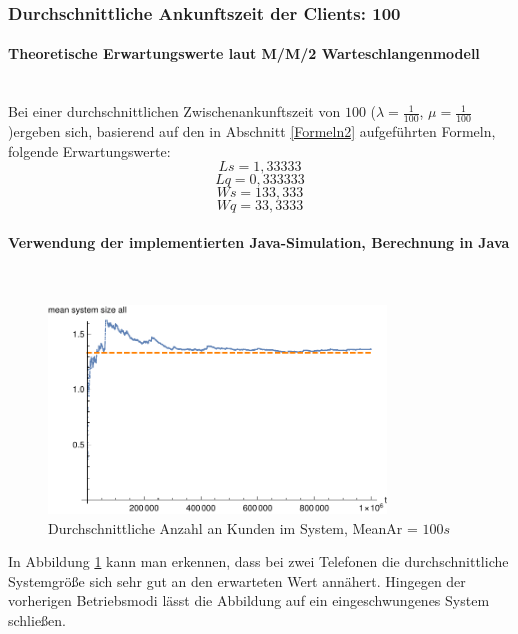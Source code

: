 \subsubsection{Durchschnittliche Ankunftszeit der Clients: 100}
\paragraph{Theoretische Erwartungswerte laut M/M/2 Warteschlangenmodell}
\\
Bei einer durchschnittlichen Zwischenankunftszeit von $100$ ($\lambda=\frac{1}{100}$, $\mu=\frac{1}{100}$)ergeben sich, basierend auf den in Abschnitt \ref{Formeln2} aufgeführten Formeln, folgende Erwartungswerte:
\begin{equation}
Ls=1,33333
\end{equation}
\begin{equation}
Lq=0,333333
\end{equation}
\begin{equation}
Ws=133,333
\end{equation}
\begin{equation}
Wq=33,3333
\end{equation}

\paragraph{Verwendung der implementierten Java-Simulation, Berechnung in Java}
\label{JavaTwoPhones100}
\\
\begin{figure}[htpb]
	\centering
	\includegraphics[width=0.8\textwidth]{abbildungen/2_Phone_VIP/Arrival_100_Serve_100_dur_1000000_Skip_0/MeanSystemSizeAll.pdf}
	\caption{Durchschnittliche Anzahl an Kunden im System, MeanAr = $100s$}
	\label{fig:mean3SystemSize100}
\end{figure}

In Abbildung \ref{fig:mean3SystemSize100} kann man erkennen, dass bei zwei Telefonen die durchschnittliche Systemgröße sich sehr gut an den erwarteten Wert annähert. Hingegen der vorherigen Betriebsmodi lässt die Abbildung auf ein eingeschwungenes System schließen.

